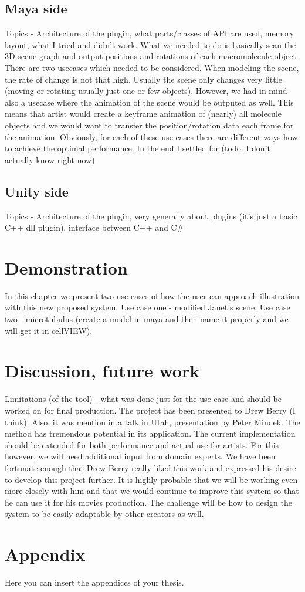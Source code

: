 \documentclass[
  digital, %
  table,   %
  nolof,     %
  nolot,     %
]{fithesis3}
\begin{document}
\section{Maya side}
Topics - Architecture of the plugin, what parts/classes of API are used, memory layout, what I tried and didn't work.
What we needed to do is basically scan the 3D scene graph and output positions and rotations of each macromolecule object. There are two usecases which needed to be considered. When modeling the scene, the rate of change is not that high. Usually the scene only changes very little (moving or rotating usually just one or few objects). However, we had in mind also a usecase where the animation of the scene would be outputed as well. This means that artist would create a keyframe animation of (nearly) all molecule objects and we would want to transfer the position/rotation data each frame for the animation. Obviously, for each of these use cases there are different ways how to achieve the optimal performance. In the end I settled for (todo: I don't actually know right now)
\section{Unity side}
Topics - Architecture of the plugin, very generally about plugins (it's just a basic C++ dll plugin), interface between C++ and C\#

\chapter{Demonstration}
In this chapter we present two use cases of how the user can approach illustration with this new proposed system.
Use case one - modified Janet's scene.
Use case two - microtubulus (create a model in maya and then name it properly and we will get it in cellVIEW).

\chapter{Discussion, future work}
Limitations (of the tool) - what was done just for the use case and should be worked on for final production.
The project has been presented to Drew Berry (I think). Also, it was mention in a talk in Utah, presentation by Peter Mindek.
The method has tremendous potential in its application. The current implementation should be extended for both performance and actual use for artists. For this however, we will need additional input from domain experts. We have been fortunate enough that Drew Berry really liked this work and expressed his desire to develop this project further. It is highly probable that we will be working even more closely with him and that we would continue to improve this system so that he can use it for his movies production.
The challenge will be how to design the system to be easily adaptable by other creators as well.

\appendix %
\chapter{Appendix}
Here you can insert the appendices of your thesis.
\end{document}
